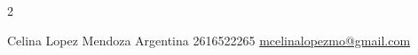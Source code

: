 \documentclass[lighthipster]{simplehipstercv}
\newlength{\rightcolwidth}
\begin{document}
\begin{paracol}{2}
\setlength{\parindent}{0pt}
\begin{minipage}[t]{\rightcolwidth}
\begin{center}\fontfamily{\sfdefault}\selectfont \color{black!70}
{\small Celina Lopez  Mendoza  Argentina  2616522265 \newline {} \protect\url{mcelinalopezmo@gmail.com} }
\end{center}
\end{minipage}

\end{paracol}
\end{document}
